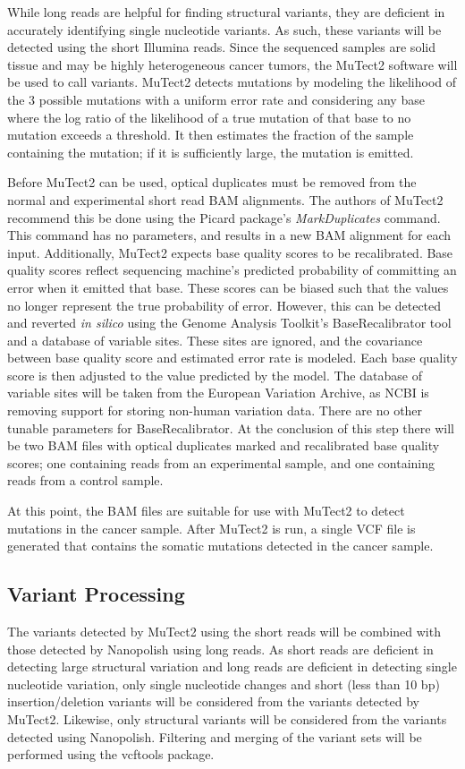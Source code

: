 While long reads are helpful for finding structural variants, they are deficient in accurately identifying single nucleotide variants. As such, these variants will be detected using the short Illumina reads. Since the sequenced samples are solid tissue and may be highly heterogeneous cancer tumors, the MuTect2 software will be used to call variants. MuTect2 detects mutations by modeling the likelihood of the 3 possible mutations with a uniform error rate and considering any base where the log ratio of the likelihood of a true mutation of that base to no mutation exceeds a threshold. It then estimates the fraction of the sample containing the mutation; if it is sufficiently large, the mutation is emitted.

Before MuTect2 can be used, optical duplicates must be removed from the normal and experimental short read BAM alignments. The authors of MuTect2 recommend this be done using the Picard package's \textit{MarkDuplicates} command. This command has no parameters, and results in a new BAM alignment for each input. Additionally, MuTect2 expects base quality scores to be recalibrated. Base quality scores reflect sequencing machine's predicted probability of committing an error when it emitted that base. These scores can be biased such that the values no longer represent the true probability of error. However, this can be detected and reverted \textit{in silico} using the Genome Analysis Toolkit's BaseRecalibrator tool and a database of variable sites. These sites are ignored, and the covariance between base quality score and estimated error rate is modeled. Each base quality score is then adjusted to the value predicted by the model. The database of variable sites will be taken from the European Variation Archive, as NCBI is removing support for storing non-human variation data. There are no other tunable parameters for BaseRecalibrator. At the conclusion of this step there will be two BAM files with optical duplicates marked and recalibrated base quality scores; one containing reads from an experimental sample, and one containing reads from a control sample.

At this point, the BAM files are suitable for use with MuTect2 to detect mutations in the cancer sample. After MuTect2 is run, a single VCF file is generated that contains the somatic mutations detected in the cancer sample.

\subsection{Variant Processing}
The variants detected by MuTect2 using the short reads will be combined with those detected by Nanopolish using long reads. As short reads are deficient in detecting large structural variation and long reads are deficient in detecting single nucleotide variation, only single nucleotide changes and short (less than 10 bp) insertion/deletion variants will be considered from the variants detected by MuTect2. Likewise, only structural variants will be considered from the variants detected using Nanopolish.
Filtering and merging of the variant sets will be performed using the vcftools package.

